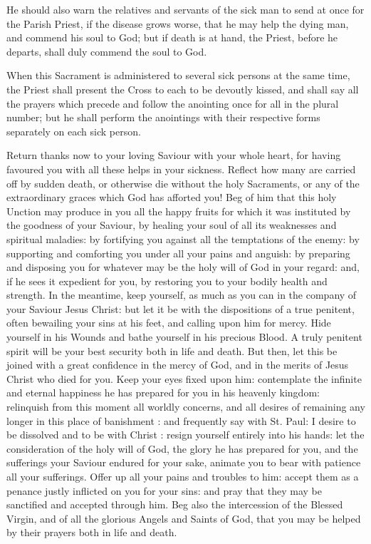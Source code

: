 \begin{rubric}
    He should also warn the relatives and servants of the sick man to send at once for the Parish Priest, if the disease grows worse, that he may help the dying man, and commend his soul to God; but if death is at hand, the Priest, before he departs, shall duly commend the soul to God.
\end{rubric}
\begin{rubric}
    When this Sacrament is administered to several sick persons at the same time, the Priest shall present the Cross to each to be devoutly kissed, and shall say all the prayers which precede and follow the anointing once for all in the plural number; but he shall perform the anointings with their respective forms separately on each sick person.
\end{rubric}
\par\noindent
Return thanks now to your loving Saviour with your whole heart, for having favoured you with all these helps in your sickness. Reflect how many are carried off by sudden death, or otherwise die without the holy Sacraments, or any of the extraordinary graces which God has afforted you! Beg of him that this holy Unction may produce in you all the happy fruits for which it was instituted by the goodness of your Saviour, by healing your soul of all its weaknesses and spiritual maladies: by fortifying you against all the temptations of the enemy: by supporting and comforting you under all your pains and anguish: by preparing and disposing you for whatever may be the holy will of God in your regard: and, if he sees it expedient for you, by restoring you to your bodily health and strength. In the meantime, keep yourself, as much as you can in the company of your Saviour Jesus Christ: but let it be with the dispositions of a true penitent, often bewailing your sins at his feet, and calling upon him for mercy. Hide yourself in his Wounds and bathe yourself in his precious Blood. A truly penitent spirit will be your best security both in life and death. But then, let this be joined with a great confidence in the mercy of God, and in the merits of Jesus Christ who died for you. Keep your eyes fixed upon him: contemplate the infinite and eternal happiness he has prepared for you in his heavenly kingdom: relinquish from this moment all worldly concerns, and all desires of remaining any longer in this place of banishment : and frequently say with St. Paul: I desire to be dissolved and to be with Christ : resign yourself entirely into his hands: let the consideration of the holy will of God, the glory he has prepared for you, and the sufferings your Saviour endured for your sake, animate you to bear with patience all your sufferings. Offer up all your pains and troubles to him: accept them as a penance justly inflicted on you for your sins: and pray that they may be sanctified and accepted through him. Beg also the intercession of the Blessed Virgin, and of all the glorious Angels and Saints of God, that you may be helped by their prayers both in life and death.
